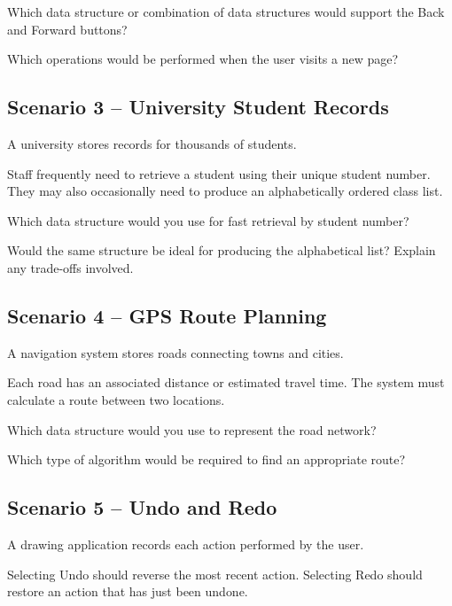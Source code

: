 \documentclass{csc2059practical}
\begin{document}
\begin{reflectionbox}
Which data structure or combination of data structures would support the Back and Forward buttons?

Which operations would be performed when the user visits a new page?
\end{reflectionbox}

\subsection*{Scenario 3 -- University Student Records}

A university stores records for thousands of students.

Staff frequently need to retrieve a student using their unique student number. They may also occasionally need to produce an alphabetically ordered class list.

\begin{reflectionbox}
Which data structure would you use for fast retrieval by student number?

Would the same structure be ideal for producing the alphabetical list? Explain any trade-offs involved.
\end{reflectionbox}

\subsection*{Scenario 4 -- GPS Route Planning}

A navigation system stores roads connecting towns and cities.

Each road has an associated distance or estimated travel time. The system must calculate a route between two locations.

\begin{reflectionbox}
Which data structure would you use to represent the road network?

Which type of algorithm would be required to find an appropriate route?
\end{reflectionbox}

\subsection*{Scenario 5 -- Undo and Redo}

A drawing application records each action performed by the user.

Selecting Undo should reverse the most recent action. Selecting Redo should restore an action that has just been undone.
\end{document}
